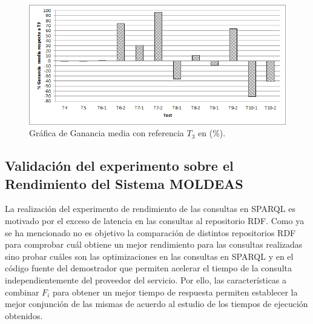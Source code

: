 \begin{figure}[!htb]
\centering
	\includegraphics[width=14cm]{./images/phd/experimentation/t3-t10-ganancia}
\caption{Gráfica de Ganancia media con referencia $T_3$ en (\%).}
\label{fig:results-graph-2}
\end{figure}

\subsection{Validación del experimento sobre el Rendimiento del Sistema MOLDEAS}
La realización del experimento de rendimiento de las consultas en \gls{SPARQL} es motivado por el exceso 
de latencia en las consultas al repositorio \gls{RDF}. Como ya se ha mencionado no es objetivo la comparación 
de distintos repositorios RDF para comprobar cuál obtiene un mejor rendimiento para las consultas realizadas 
sino probar cuáles son las optimizaciones en las consultas en SPARQL y en el código fuente del demostrador que 
permiten acelerar el tiempo de la consulta independientemente del proveedor del servicio. Por ello, las características 
a combinar $F_i$ para obtener un mejor tiempo de respuesta permiten establecer la mejor conjunción de las mismas de acuerdo 
al estudio de los tiempos de ejecución obtenidos. 

